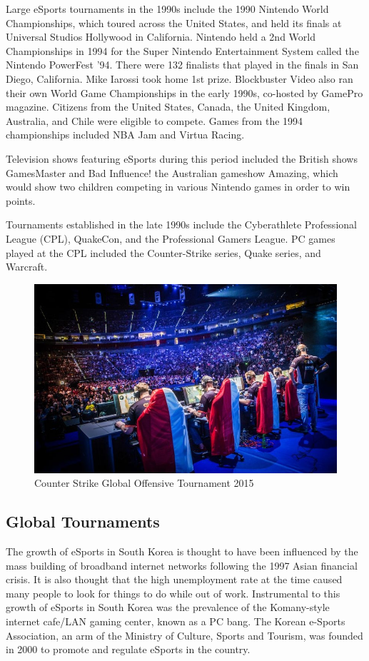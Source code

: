 		Large eSports tournaments in the 1990s include the 1990 Nintendo World Championships, which toured across the United States, and held its finals at Universal Studios Hollywood in California. Nintendo held a 2nd World Championships in 1994 for the Super Nintendo Entertainment System called the Nintendo PowerFest '94. There were 132 finalists that played in the finals in San Diego, California. Mike Iarossi took home 1st prize. Blockbuster Video also ran their own World Game Championships in the early 1990s, co-hosted by GamePro magazine. Citizens from the United States, Canada, the United Kingdom, Australia, and Chile were eligible to compete. Games from the 1994 championships included NBA Jam and Virtua Racing.
		
		Television shows featuring eSports during this period included the British shows GamesMaster and Bad Influence! the Australian gameshow Amazing, which would show two children competing in various Nintendo games in order to win points.
		
		Tournaments established in the late 1990s include the Cyberathlete Professional League (CPL), QuakeCon, and the Professional Gamers League. PC games played at the CPL included the Counter-Strike series, Quake series, and Warcraft.
		
		\begin{figure}[!h]
			\begin{center}
				\includegraphics[width=0.68\linewidth]{images/esports_csgo}
				\caption{Counter Strike Global Offensive Tournament 2015}
			\end{center}
		\end{figure}
		\newpage
	\subsection{Global Tournaments}
		
		The growth of eSports in South Korea is thought to have been influenced by the mass building of broadband internet networks following the 1997 Asian financial crisis. It is also thought that the high unemployment rate at the time caused many people to look for things to do while out of work. Instrumental to this growth of eSports in South Korea was the prevalence of the Komany-style internet cafe/LAN gaming center, known as a PC bang. The Korean e-Sports Association, an arm of the Ministry of Culture, Sports and Tourism, was founded in 2000 to promote and regulate eSports in the country.
		
